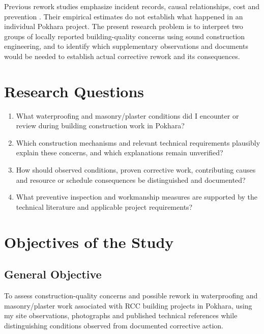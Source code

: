 Previous rework studies emphasize incident records, causal relationships, cost and prevention \parencite{liu2020,garg2021,mostofi2022}. Their empirical estimates do not establish what happened in an individual Pokhara project. The present research problem is to interpret two groups of locally reported building-quality concerns using sound construction engineering, and to identify which supplementary observations and documents would be needed to establish actual corrective rework and its consequences.

\section{Research Questions}
\begin{enumerate}
\item What waterproofing and masonry/plaster conditions did I encounter or review during building construction work in Pokhara?
\item Which construction mechanisms and relevant technical requirements plausibly explain these concerns, and which explanations remain unverified?
\item How should observed conditions, proven corrective work, contributing causes and resource or schedule consequences be distinguished and documented?
\item What preventive inspection and workmanship measures are supported by the technical literature and applicable project requirements?
\end{enumerate}

\section{Objectives of the Study}
\subsection{General Objective}
To assess construction-quality concerns and possible rework in waterproofing and masonry/plaster work associated with RCC building projects in Pokhara, using my site observations, photographs and published technical references while distinguishing conditions observed from documented corrective action.

